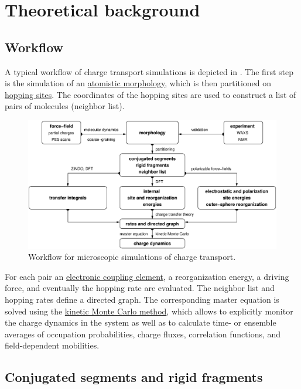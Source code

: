 \chapter{Theoretical background}
\label{sec:theory}

\section{Workflow}
A typical workflow of charge transport simulations is depicted in . The first step is the simulation of an \hyperref[sec:morphology]{atomistic morphology}, which is then partitioned on \hyperref[sec:mapping]{hopping sites}. The coordinates of the hopping sites are used to construct a list of pairs of molecules (neighbor list). 

\begin{figure}[h]
\includegraphics[width=\textwidth]{fig/workflow/workflow}
 \caption{%
   Workflow for microscopic simulations of charge transport.  %
   \label{fig:workflow}}
\end{figure}

For each pair an \hyperref[sec:transfer_integrals]{electronic coupling element}, a reorganization energy, a driving force, and eventually the hopping rate are evaluated. The neighbor list and hopping rates define a directed graph. The corresponding master equation is solved using the  \hyperref[sec:kmc]{kinetic Monte Carlo method}, which allows to explicitly monitor the charge dynamics in the system as well as to calculate time- or ensemble averages of occupation probabilities, charge fluxes, correlation functions, and field-dependent mobilities.


\section{Conjugated segments and rigid fragments}
\label{sec:conjugated_segments}

